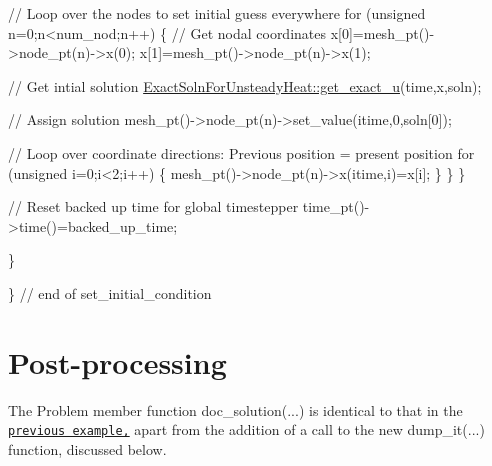 \begin{DoxyCodeInclude}
     \textcolor{comment}{// Loop over the nodes to set initial guess everywhere}
     \textcolor{keywordflow}{for} (\textcolor{keywordtype}{unsigned} n=0;n<num\_nod;n++)
      \{
       \textcolor{comment}{// Get nodal coordinates}
       x[0]=mesh\_pt()->node\_pt(n)->x(0);
       x[1]=mesh\_pt()->node\_pt(n)->x(1);
       
       \textcolor{comment}{// Get intial solution}
       \hyperlink{namespaceExactSolnForUnsteadyHeat_a1d5b22857bd2a7825397daf1cf9c89eb}{ExactSolnForUnsteadyHeat::get\_exact\_u}(time,x,soln);
       
       \textcolor{comment}{// Assign solution}
       mesh\_pt()->node\_pt(n)->set\_value(itime,0,soln[0]);
       
       \textcolor{comment}{// Loop over coordinate directions: Previous position = present position}
       \textcolor{keywordflow}{for} (\textcolor{keywordtype}{unsigned} i=0;i<2;i++)
        \{
         mesh\_pt()->node\_pt(n)->x(itime,i)=x[i];
        \}
      \} 
    \}
   
   \textcolor{comment}{// Reset backed up time for global timestepper}
   time\_pt()->time()=backed\_up\_time;

  \}


\} \textcolor{comment}{// end of set\_initial\_condition}

\end{DoxyCodeInclude}




 

\hypertarget{index_doc}{}\section{Post-\/processing}\label{index_doc}
The Problem member function {\ttfamily doc\+\_\+solution}(...) is identical to that in the \href{../../two_d_unsteady_heat/html/index.html}{\tt previous example,} apart from the addition of a call to the new {\ttfamily dump\+\_\+it}(...) function, discussed below.






